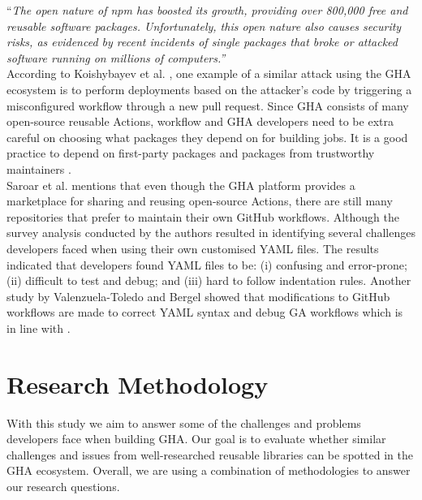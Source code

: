 \documentclass[conference]{IEEEtran}
\begin{document}
    “\textit{The open nature of npm has boosted its growth, providing over 800,000 free and reusable software packages. Unfortunately, this open nature also causes security risks, as evidenced by recent incidents of single packages that broke or attacked software running on millions of computers.”} \\

    According to Koishybayev et al. \cite{koishybayev2022characterizing}, one example of a similar attack using the GHA ecosystem is to perform deployments based on the attacker’s code by triggering a misconfigured workflow through a new pull request. Since GHA consists of many open-source reusable Actions, workflow and GHA developers need to be extra careful on choosing what packages they depend on for building jobs. It is a good practice to depend on first-party packages and packages from trustworthy maintainers \cite{zimmermann2019small}. \\

    Saroar et al. \cite{saroar2023developers} mentions that even though the GHA platform provides a marketplace for sharing and reusing open-source Actions, there are still many repositories that prefer to maintain their own GitHub workflows. Although the survey analysis conducted by the authors resulted in identifying several challenges developers faced when using their own customised YAML files.  The results indicated that developers found YAML files to be: (i) confusing and error-prone; (ii) difficult to test and debug; and (iii) hard to follow indentation rules. Another study by Valenzuela-Toledo and Bergel \cite{valenzuela2022evolution}  showed that modifications to GitHub workflows are made to correct YAML syntax and debug GA workflows which is in line with \cite{saroar2023developers}.



\section{Research Methodology}
    With this study we aim to answer some of the challenges and problems developers face when building GHA. Our goal is to evaluate whether similar challenges and issues from well-researched reusable libraries can be spotted in the GHA ecosystem. Overall,  we are using a combination of methodologies to answer our research questions.\\
\end{document}
